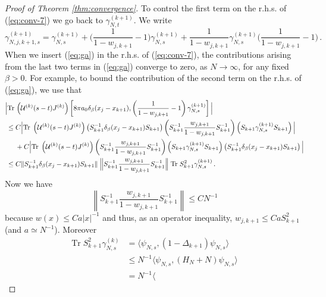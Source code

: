 \documentclass[11pt]{article}
\newcommand{\cU}{{\cal U}}
\newcommand{\tr}{\mbox{Tr}}
\begin{document}
\begin{proof}[Proof of Theorem \ref{thm:convergence}]
To control the first term on the r.h.s. of (\ref{eq:conv-7}) we go
back to $ \gamma_{N,t}^{(k+1)}$. We write
\begin{equation}\label{eq:ga}
\gamma^{(k+1)}_{N,j,k+1,s} = \gamma^{(k+1)}_{N,s} +
\Big(\frac{1}{1-w_{j,k+1}}-1\Big) \gamma^{(k+1)}_{N,s} +
\frac{1}{1-w_{j,k+1}} \gamma^{(k+1)}_{N,s}
\Big(\frac{1}{1-w_{j,k+1}}-1\Big)\,.
\end{equation}
When we insert (\ref{eq:ga}) in the r.h.s. of (\ref{eq:conv-7}), the
contributions arising from the last two terms in (\ref{eq:ga})
converge to zero, as $N \to \infty$, for any fixed $\beta >0$. For
example, to bound the contribution of the second term on the r.h.s.
of (\ref{eq:ga}), we use that
\begin{equation}\label{eq:conv-9}
\begin{split}
\Big| \tr \,& \left(\cU^{(k)} (s-t) J^{(k)}\right) \left[ 8\pi a_0
\delta_{\beta} (x_j -x_{k+1}), \left( \frac{1}{1-w_{j,k+1}}-1\right)
\gamma_{N,s}^{(k+1)} \right] \Big| \\ \leq \; &C \Big| \tr \;
\left(\cU^{(k)} (s-t) J^{(k)}\right) \left( S_{k+1}^{-1}
\delta_{\beta} (x_j -x_{k+1}) S_{k+1} \right) \left( S_{k+1}^{-1}
\frac{w_{j,k+1}}{1-w_{j,k+1}} S_{k+1}^{-1}\right) \left(
S_{k+1} \gamma_{N,s}^{(k+1)}S_{k+1}\right) \Big|\\
&+ C \Big| \tr \; \left(\cU^{(k)} (s-t) J^{(k)}\right)
\left(S_{k+1}^{-1} \frac{w_{j,k+1}}{1-w_{j,k+1}} S_{k+1}^{-1}\right)
\left( S_{k+1} \gamma_{N,s}^{(k+1)}S_{k+1}\right) \left(
S_{k+1}^{-1} \delta_{\beta} (x_j -x_{k+1}) S_{k+1}\right)  \Big|
\\ \leq \; &C \| S_{k+1}^{-1} \delta_{\beta} (x_j -x_{k+1}) S_{k+1} \|
\; \Big\| S_{k+1}^{-1}\frac{w_{j,k+1}}{1-w_{j,k+1}} S_{k+1}^{-1}\Big\| \;
\tr \; S_{k+1}^2  \gamma_{N,s}^{(k+1)}\,.
\end{split}
\end{equation}
Now we have
\begin{equation}
\left\| S_{k+1}^{-1} \frac{w_{j,k+1}}{1-w_{j,k+1}} S_{k+1}^{-1}
\right\| \leq C N^{-1}
\end{equation}
because $w(x) \leq C a |x|^{-1}$ and thus, as an operator
inequality, $w_{j,k+1} \leq Ca S_{k+1}^2$ (and $a \simeq N^{-1}$).
Moreover
\begin{equation}\label{eq:conv-9b}
\begin{split}
\tr \; S_{k+1}^2  \gamma_{N,s}^{(k)} &=  \langle  \psi_{N,s},
(1-\Delta_{k+1})  \psi_{N,s} \rangle \\ &\leq  N^{-1} \langle
\psi_{N,s}, (H_N +N)  \psi_{N,s} \rangle \\ &= N^{-1} \langle

\end{split}
\end{equation}
\end{proof}
\end{document}
